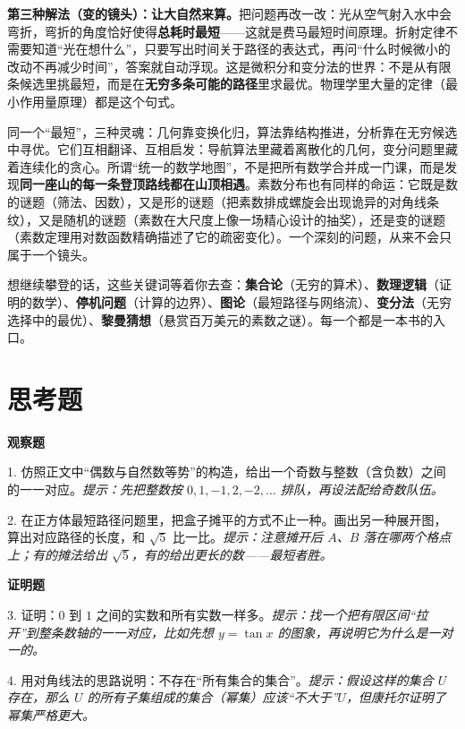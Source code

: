 \textbf{第三种解法（变的镜头）：让大自然来算。}把问题再改一改：光从空气射入水中会弯折，弯折的角度恰好使得\textbf{总耗时最短}——这就是费马最短时间原理。折射定律不需要知道“光在想什么”，只要写出时间关于路径的表达式，再问“什么时候微小的改动不再减少时间”，答案就自动浮现。这是微积分和变分法的世界：不是从有限条候选里挑最短，而是在\textbf{无穷多条可能的路径}里求最优。物理学里大量的定律（最小作用量原理）都是这个句式。

同一个“最短”，三种灵魂：几何靠变换化归，算法靠结构推进，分析靠在无穷候选中寻优。它们互相翻译、互相启发：导航算法里藏着离散化的几何，变分问题里藏着连续化的贪心。所谓“统一的数学地图”，不是把所有数学合并成一门课，而是发现\textbf{同一座山的每一条登顶路线都在山顶相遇}。素数分布也有同样的命运：它既是数的谜题（筛法、因数），又是形的谜题（把素数排成螺旋会出现诡异的对角线条纹），又是随机的谜题（素数在大尺度上像一场精心设计的抽奖），还是变的谜题（素数定理用对数函数精确描述了它的疏密变化）。一个深刻的问题，从来不会只属于一个镜头。

\begin{pandeng}
想继续攀登的话，这些关键词等着你去查：\textbf{集合论}（无穷的算术）、\textbf{数理逻辑}（证明的数学）、\textbf{停机问题}（计算的边界）、\textbf{图论}（最短路径与网络流）、\textbf{变分法}（无穷选择中的最优）、\textbf{黎曼猜想}（悬赏百万美元的素数之谜）。每一个都是一本书的入口。
\end{pandeng}

\section*{思考题}

\textbf{观察题}

1. 仿照正文中“偶数与自然数等势”的构造，给出一个奇数与整数（含负数）之间的一一对应。\emph{提示：先把整数按 $0, 1, -1, 2, -2, \ldots$ 排队，再设法配给奇数队伍。}

2. 在正方体最短路径问题里，把盒子摊平的方式不止一种。画出另一种展开图，算出对应路径的长度，和 $\sqrt{5}$ 比一比。\emph{提示：注意摊开后 $A$、$B$ 落在哪两个格点上；有的摊法给出 $\sqrt{5}$，有的给出更长的数——最短者胜。}

\textbf{证明题}

3. 证明：$0$ 到 $1$ 之间的实数和所有实数一样多。\emph{提示：找一个把有限区间“拉开”到整条数轴的一一对应，比如先想 $y = \tan x$ 的图象，再说明它为什么是一对一的。}

4. 用对角线法的思路说明：不存在“所有集合的集合”。\emph{提示：假设这样的集合 $U$ 存在，那么 $U$ 的所有子集组成的集合（幂集）应该“不大于”$U$，但康托尔证明了幂集严格更大。}

